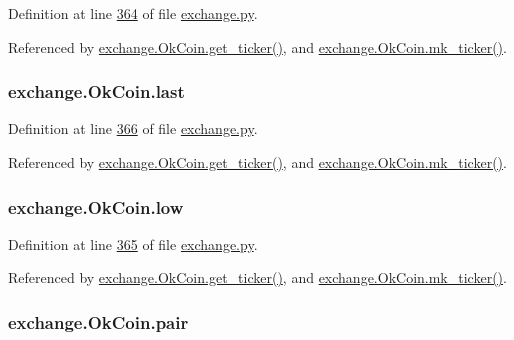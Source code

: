 Definition at line \hyperlink{exchange_8py_source_l00364}{364} of file \hyperlink{exchange_8py_source}{exchange.\+py}.



Referenced by \hyperlink{exchange_8py_source_l00371}{exchange.\+Ok\+Coin.\+get\+\_\+ticker()}, and \hyperlink{exchange_8py_source_l00385}{exchange.\+Ok\+Coin.\+mk\+\_\+ticker()}.

\subsubsection[{\texorpdfstring{last}{last}}]{\setlength{\rightskip}{0pt plus 5cm}exchange.\+Ok\+Coin.\+last}\hypertarget{classexchange_1_1_ok_coin_a726afbe3a75835fdcbe523aed8d6763c}{}\label{classexchange_1_1_ok_coin_a726afbe3a75835fdcbe523aed8d6763c}


Definition at line \hyperlink{exchange_8py_source_l00366}{366} of file \hyperlink{exchange_8py_source}{exchange.\+py}.



Referenced by \hyperlink{exchange_8py_source_l00371}{exchange.\+Ok\+Coin.\+get\+\_\+ticker()}, and \hyperlink{exchange_8py_source_l00385}{exchange.\+Ok\+Coin.\+mk\+\_\+ticker()}.

\subsubsection[{\texorpdfstring{low}{low}}]{\setlength{\rightskip}{0pt plus 5cm}exchange.\+Ok\+Coin.\+low}\hypertarget{classexchange_1_1_ok_coin_a1afa53e0ad63830d0585288abea42094}{}\label{classexchange_1_1_ok_coin_a1afa53e0ad63830d0585288abea42094}


Definition at line \hyperlink{exchange_8py_source_l00365}{365} of file \hyperlink{exchange_8py_source}{exchange.\+py}.



Referenced by \hyperlink{exchange_8py_source_l00371}{exchange.\+Ok\+Coin.\+get\+\_\+ticker()}, and \hyperlink{exchange_8py_source_l00385}{exchange.\+Ok\+Coin.\+mk\+\_\+ticker()}.

\subsubsection[{\texorpdfstring{pair}{pair}}]{\setlength{\rightskip}{0pt plus 5cm}exchange.\+Ok\+Coin.\+pair}\hypertarget{classexchange_1_1_ok_coin_a52f3b919f86565518d46c49c5b8f66a6}{}\label{classexchange_1_1_ok_coin_a52f3b919f86565518d46c49c5b8f66a6}


